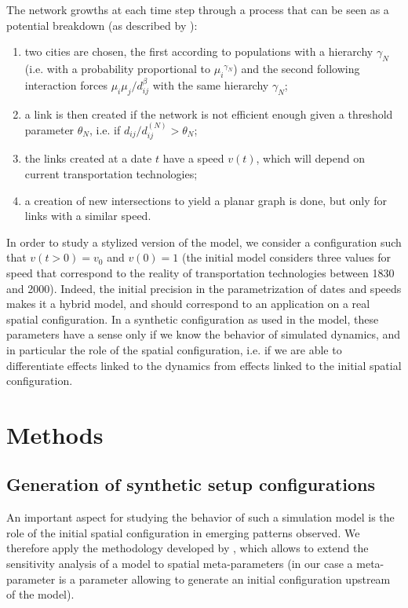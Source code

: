 The network growths at each time step through a process that can be seen as a potential breakdown (as described by \cite{raimbault:tel-01857741}):
\begin{enumerate}
	\item two cities are chosen, the first according to populations with a hierarchy $\gamma_N$ (i.e. with a probability proportional to ${\mu_i}^{\gamma_N}$) and the second following interaction forces $\mu_i \mu_j / d_{ij}^\beta$ with the same hierarchy $\gamma_N$;
	\item a link is then created if the network is not efficient enough given a threshold parameter $\theta_N$, i.e. if $d_{ij}/d^{(N)}_{ij}> \theta_N$;
	\item the links created at a date $t$ have a speed $v(t)$, which will depend on current transportation technologies;
	\item a creation of new intersections to yield a planar graph is done, but only for links with a similar speed.
\end{enumerate}

In order to study a stylized version of the model, we consider a configuration such that $v(t > 0) = v_0$ and $v(0) = 1$ (the initial model considers three values for speed that correspond to the reality of transportation technologies between 1830 and 2000). Indeed, the initial precision in the parametrization of dates and speeds makes it a hybrid model, and should correspond to an application on a real spatial configuration. In a synthetic configuration as used in the model, these parameters have a sense only if we know the behavior of simulated dynamics, and in particular the role of the spatial configuration, i.e. if we are able to differentiate effects linked to the dynamics from effects linked to the initial spatial configuration.



\section{Methods}

\subsection{Generation of synthetic setup configurations}


An important aspect for studying the behavior of such a simulation model is the role of the initial spatial configuration in emerging patterns observed. We therefore apply the methodology developed by \cite{cottineau2017initial}, which allows to extend the sensitivity analysis of a model to spatial meta-parameters (in our case a meta-parameter is a parameter allowing to generate an initial configuration upstream of the model).


